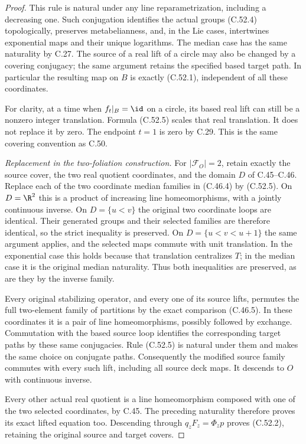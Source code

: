 \begin{proof}
This rule is natural under any line reparametrization,
including a decreasing one. Such conjugation identifies
the actual groups (C.52.4) topologically, preserves
metabelianness, and, in the Lie cases, intertwines
exponential maps and their unique logarithms. The
median case has the same naturality by C.27.
The source of a real lift of a circle may also be
changed by a covering conjugacy; the same argument
retains the specified based target path.
In particular the resulting map on $B$ is exactly
(C.52.1), independent of all these coordinates.

For clarity, at a time when $f_t|_B=\id$ on a circle,
its based real lift can still be a nonzero integer
translation. Formula (C.52.5) scales that real
translation. It does not replace it by zero.
The endpoint $t=1$ is zero by C.29. This is the same
covering convention as C.50.

\emph{Replacement in the two-foliation construction.}
For $|\mathscr F_O|=2$, retain exactly the source cover,
the two real quotient coordinates, and the domain $D$
of C.45--C.46. Replace each of the two coordinate
median families in (C.46.4) by (C.52.5).
On $D=\R^2$ this is a product of increasing line
homeomorphisms, with a jointly continuous inverse.
On $D=\{u<v\}$ the original two coordinate loops are
identical. Their generated groups and their selected
families are therefore identical, so the strict
inequality is preserved. On $D=\{u<v<u+1\}$ the same
argument applies, and the selected maps commute with
unit translation. In the exponential case this holds
because that translation centralizes $T$; in the
median case it is the original median naturality.
Thus both inequalities are preserved, as are they
by the inverse family.

Every original stabilizing operator, and every one
of its source lifts, permutes the full two-element
family of partitions by the exact comparison
(C.46.5). In these coordinates it is a pair of line
homeomorphisms, possibly followed by exchange.
Commutation with the based source loop identifies
the corresponding target paths by these same
conjugacies. Rule (C.52.5) is natural under them
and makes the same choice on conjugate paths.
Consequently the modified source family commutes
with every such lift, including all source deck maps.
It descends to $O$ with continuous inverse.

Every other actual real quotient is a line
homeomorphism composed with one of the two selected
coordinates, by C.45. The preceding naturality
therefore proves its exact lifted equation too.
Descending through $q_zF_z=\Phi_zp$ proves (C.52.2),
retaining the original source and target covers.


\end{proof}
